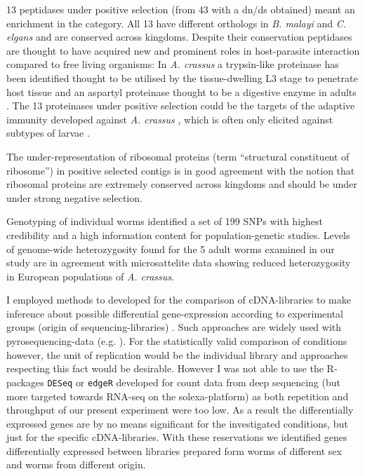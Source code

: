 13 peptidases under positive selection (from 43 with a dn/ds obtained)
meant an enrichment in the category. All 13 have different orthologs
in \textit{B. malayi} and \textit{C. elgans} and are conserved across
kingdoms. Despite their conservation peptidases are thought to have
acquired new and prominent roles in host-parasite interaction compared
to free living organisms: In \textit{A. crassus} a trypsin-like
proteinase has been identified thought to be utilised by the
tissue-dwelling L3 stage to penetrate host tissue and an aspartyl
proteinase thought to be a digestive enzyme in adults
\cite{polzer_identification_1993}. The 13 proteinases under positive
selection could be the targets of the adaptive immunity developed
against \textit{A. crassus} \cite{knopf_migratory_2008,
  knopf_vaccination_2008}, which is often only elicited against
subtypes of larvae \cite{molnar_caps}.

The under-representation of ribosomal proteins (term ``structural
constituent of ribosome'') in positive selected contigs is in good
agreement with the notion that ribosomal proteins are extremely
conserved across kingdoms \cite{pmid9664699} and should be under under
strong negative selection.

Genotyping of individual worms identified a set of 199
SNPs with highest credibility and a high information content for
population-genetic studies. Levels of genome-wide heterozygosity found
for the 5 adult worms examined in our study are in agreement with
microsattelite data \cite{wielgoss_population_2008} showing reduced
heterozygosity in European populations of \textit{A. crassus}.

I employed methods to developed for the comparison of cDNA-libraries
to make inference about possible differential gene-expression
according to experimental groups (origin of sequencing-libraries)
\cite{pmid9331369}. Such approaches are widely used with
pyrosequencing-data (e.g. \cite{pmid20470405}). For the statistically
valid comparison of conditions however, the unit of replication would
be the individual library and approaches respecting this fact would be
desirable. However I was not able to use the R-packages \texttt{DESeq}
\cite{pmid20979621} or \texttt{edgeR} \cite{pmid19910308} developed for count
data from deep sequencing (but more targeted towards RNA-seq on the
solexa-platform) as both repetition and throughput of our present
experiment were too low. As a result the differentially expressed
genes are by no means significant for the investigated conditions, but
just for the specific cDNA-libraries. With these reservations we
identified genes differentially expressed between libraries prepared
form worms of different sex and worms from different origin.

